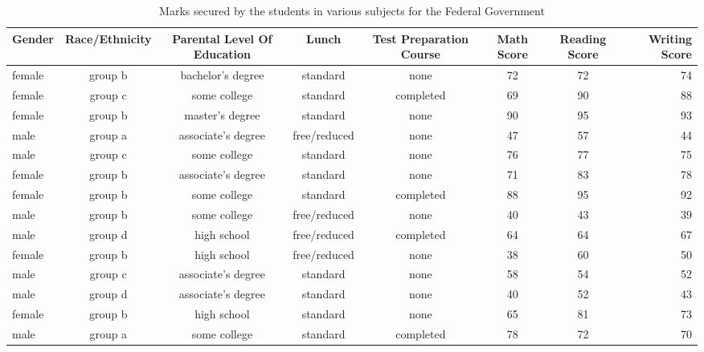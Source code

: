 \documentclass{article}
\begin{document}
	\begin{sidewaystable}[h!]
    	\begin{center}
		  	\caption{Marks secured by the students in various subjects for the Federal Government}
	\begin{tabular}{|l|c|c|c|c|c|c|r|}
		  		\hline
		  		\textbf{Gender} & \textbf{Race/Ethnicity} & \textbf{Parental Level Of Education} & \textbf{Lunch} &
		  		\textbf{Test Preparation Course} & \textbf{Math Score} & \textbf{Reading Score} & \textbf{Writing Score}\\
		  		\hline
		  		female & group b & bachelor's degree & standard & none & 72 & 72 & 74\\
		  		\hline
		  	    female & group c & some college & standard & completed & 69 & 90 & 88\\
		  	    \hline
		  	    female & group b & master's degree & standard & none & 90 & 95 & 93\\
		  	    \hline
		  		male & group a & associate's degree & free/reduced & none & 47 & 57 & 44\\
		  		\hline
		  		male & group c & some college & standard & none & 76 & 77 & 75\\
		  		\hline
		  		female & group b & associate's degree & standard & none & 71 & 83 & 78\\
		  		\hline
		  		female & group b & some college & standard & completed & 88 & 95 & 92\\
		  		\hline
		  		male & group b & some college & free/reduced & none & 40 & 43 & 39\\
		  		\hline
		  		male & group d & high school & free/reduced& completed & 64 & 64 & 67\\
		  		\hline
		  		female & group b & high school & free/reduced & none & 38 & 60 & 50\\
		  		\hline
		  		male & group c & associate's degree & standard & none & 58 & 54 & 52\\
		  		\hline
		  		male & group d & associate's degree & standard & none & 40 & 52 & 43\\
		  		\hline
		  		female & group b & high school & standard & none & 65 & 81 & 73\\
		  		\hline
		  		male & group a & some college & standard & completed & 78 & 72 & 70\\
		  		\hline
		  			
	  			\end{tabular}
  			\end{center}
  		\end{sidewaystable}
  	
\end{document}
